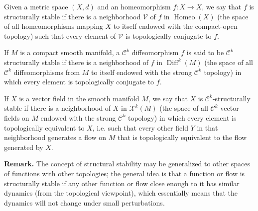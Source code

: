 \documentclass[12pt]{article}
\newcommand{\Diff}{\operatorname{Diff}}
\newcommand{\Homeo}{\operatorname{Homeo}}
\begin{document}
Given a metric space $(X,d)$ and an homeomorphism $f\colon X\to X$, we say that $f$ is structurally stable if there is a neighborhood $\mathscr{V}$ of $f$ in $\Homeo(X)$ (the space of all homeomorphisms mapping $X$ to itself endowed with the compact-open topology) such that every element of $\mathscr{V}$ is topologically conjugate to $f$.

If $M$ is a compact smooth manifold, a $\mathcal{C}^k$ diffeomorphism $f$ is said to be $\mathcal{C}^k$ structurally stable if there is a neighborhood of $f$ in $\Diff^k(M)$ (the space of all $\mathcal{C}^k$ diffeomorphisms from $M$ to itself endowed with the strong $\mathcal{C}^k$ topology) in which every element is topologically conjugate to $f$. 

If $X$ is a vector field in the smooth manifold $M$, we say that $X$ is $\mathcal{C}^k$-structurally stable if there is a neighborhood of $X$ in $\mathscr{X}^k(M)$ (the space of all $\mathcal{C}^k$ vector fields on $M$ endowed with the strong $\mathcal{C}^k$ topology) in which every element is topologically equivalent to $X$, i.e. such that every other field $Y$ in that neighborhood generates a flow on $M$ that is topologically equivalent to the flow generated by $X$.

\textbf{Remark.} The concept of structural stability may be generalized to other spaces of functions with other topologies; the general idea is that a function or flow is structurally stable if any other function or flow close enough to it has similar dynamics (from the topological viewpoint), which essentially means that the dynamics will not change under small perturbations.
\end{document}

